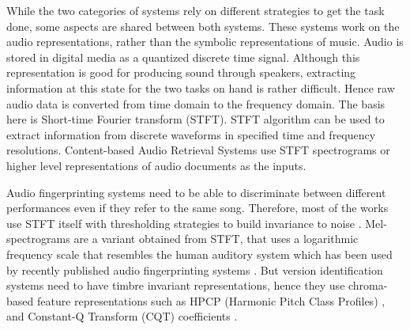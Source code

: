 \documentclass[../main.tex]{subfiles}
\begin{document}
\par
While the two categories of systems rely on different strategies to get the task done, some aspects are shared between both systems. These systems work on the audio representations, rather than the symbolic representations of music. Audio is stored in digital media as a quantized discrete time signal. Although this representation is good for producing sound through speakers, extracting information at this state for the two tasks on hand is rather difficult. Hence raw audio data is converted from time domain to the frequency domain. The basis here is Short-time Fourier transform (\Gls{STFT}).  \Gls{STFT} algorithm can be used to extract information from discrete waveforms in specified time and frequency resolutions. Content-based Audio Retrieval Systems use \gls{STFT} spectrograms or higher level representations of audio documents as the inputs.

\iffalse
Figure \ref{fig:representations} shows some of these representations \cite{book}.

\begin{figure}[ht]
    \centering
    \texttt{[image: representations.png]}
    \caption{Various representations for a recording of the chromatic scale played on a real piano. (a) Piano keys representing the chromatic scale. (b) Magnitude spectrogram. (c) Pitch-based log-frequency spectrogram. (d) Chromagram.}
    \label{fig:representations}
\end{figure}
\fi


\par
Audio fingerprinting systems need to be able to discriminate between different performances even if they refer to the same song. Therefore, most of the works use \gls{STFT} itself with thresholding strategies to build invariance to noise \cite{haitsmaHighlyRobustAudio}\cite{sift}\cite{ellisEchoPrintOpenSource2011}\cite{wangIndustrialStrengthAudio2003} \cite{computer_vision_for_music_identification}. Mel-spectrograms are a variant obtained from \gls{STFT}, that uses a logarithmic frequency scale that resembles the human auditory system which has been used by recently published audio fingerprinting systems \cite{yu_contrastive_2020}\cite{baez_suarez_unsupervised_2020}. But version identification systems need to have timbre invariant representations, hence they use chroma-based feature representations such as \gls{HPCP} (Harmonic Pitch Class Profiles) \cite{gomezSongRemainsSame2006}\cite{serraChromaBinarySimilarity2008}\cite{serraCrossRecurrenceQuantification2009}\cite{yesilerAccurateScalableVersion2020}, and Constant-Q Transform (\gls{CQT}) coefficients \cite{yuTemporalPyramidPooling2019}\cite{dorasCoverDetectionUsing2019}\cite{jiang_yang_chen_2020}.
\end{document}
